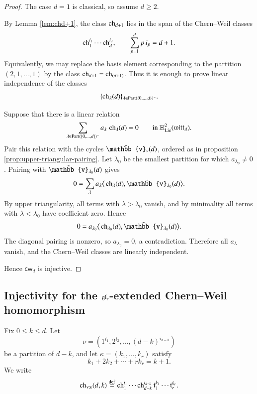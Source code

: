 \documentclass[main.tex]{subfiles}
\begin{document}
\begin{proof}
  The case $d=1$ is classical, so assume $d\geq 2$.

  By Lemma \ref{lem:chd+1}, the class $\operatorname{ch}_{d+1}$ lies in the span of the
  Chern--Weil classes
  \[
    \operatorname{ch}_1^{i_1}\cdots \operatorname{ch}_d^{i_d},
    \qquad
    \sum_{p=1}^d p\,i_p=d+1.
  \]
  Equivalently, we may replace the basis element corresponding to the partition
  $(2,1,\ldots,1)$ by the class $\operatorname{ch}_{d+1}=\operatorname{ch}_{(d+1)}$. Thus it is
  enough to prove linear independence of the classes
  \[
    \{\operatorname{ch}_{\lambda}(d)\}_{\lambda\in
    \operatorname{Part}(\{0,\ldots,d\})^{-}} .
  \]

  Suppose that there is a linear relation
  \[
    \sum_{\lambda\in \operatorname{Part}(\{0,\ldots,d\})^{-}}
    a_\lambda\,\operatorname{ch}_{\lambda}(d)=0
    \qquad
    \text{in }
    \mathbb H^2_{\operatorname{Lie}}(\mathfrak{witt}_d).
  \]
  Pair this relation with the cycles
  $\til{\mathbb{v}}_\nu(d)$, ordered as in proposition
  \ref{prop:upper-triangular-pairing}. Let $\lambda_0$ be the smallest
  partition for which $a_{\lambda_0}\neq 0$. Pairing with
  $\til{\mathbb{v}}_{\lambda_0}(d)$ gives
  \[
    0
    =
    \sum_\lambda a_\lambda
    \big\langle
      \op{ch}_\lambda(d),
      \til{\mathbb{v}}_{\lambda_0}(d)
    \big\rangle .
  \]
  By upper triangularity, all terms with $\lambda>\lambda_0$ vanish, and by
  minimality all terms with $\lambda<\lambda_0$ have coefficient zero. Hence
  \[
    0
    =
    a_{\lambda_0}
    \big\langle
      \op{ch}_{\lambda_0}(d),
      \til{\mathbb{v}}_{\lambda_0}(d)
    \big\rangle .
  \]
  The diagonal pairing is nonzero, so $a_{\lambda_0}=0$, a contradiction.
  Therefore all $a_\lambda$ vanish, and the Chern--Weil classes are linearly
  independent.

  Hence $\mathsf{cw}_d$ is injective.
\end{proof}

\subsection{Injectivity for the $\mathfrak{gl}_r$-extended Chern--Weil homomorphism}

Fix $0 \leq k \leq d$.  Let
\[
  \nu=(1^{i_1},2^{i_2},\ldots,(d-k)^{i_{d-k}})
\]
be a partition of $d-k$, and let $\kappa=(k_1,\ldots,k_r)$ satisfy
\[
  k_1+2k_2+\cdots+rk_r=k+1 .
\]
We write
\begin{equation}\label{eq:ch-nu-kappa}
  \operatorname{ch}_{\nu;\kappa}(d,k)
  \overset{\rm def}{=}
  \operatorname{ch}_1^{i_1}\cdots \operatorname{ch}_{d-k}^{i_{d-k}}
  \mathfrak{t}_1^{k_1}\cdots \mathfrak{t}_r^{k_r}.
\end{equation}
\end{document}
